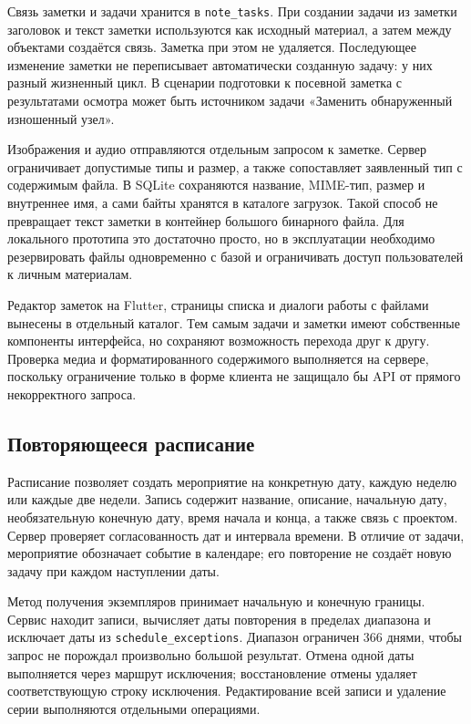 \documentclass[14pt,a4paper]{extarticle}
\begin{document}
Связь заметки и задачи хранится в \texttt{note\_tasks}. При создании задачи из заметки заголовок и текст заметки используются как исходный материал, а затем между объектами создаётся связь. Заметка при этом не удаляется. Последующее изменение заметки не переписывает автоматически созданную задачу: у них разный жизненный цикл. В сценарии подготовки к посевной заметка с результатами осмотра может быть источником задачи «Заменить обнаруженный изношенный узел».

Изображения и аудио отправляются отдельным запросом к заметке. Сервер ограничивает допустимые типы и размер, а также сопоставляет заявленный тип с содержимым файла. В SQLite сохраняются название, MIME-тип, размер и внутреннее имя, а сами байты хранятся в каталоге загрузок. Такой способ не превращает текст заметки в контейнер большого бинарного файла. Для локального прототипа это достаточно просто, но в эксплуатации необходимо резервировать файлы одновременно с базой и ограничивать доступ пользователей к личным материалам.

Редактор заметок на Flutter, страницы списка и диалоги работы с файлами вынесены в отдельный каталог. Тем самым задачи и заметки имеют собственные компоненты интерфейса, но сохраняют возможность перехода друг к другу. Проверка медиа и форматированного содержимого выполняется на сервере, поскольку ограничение только в форме клиента не защищало бы API от прямого некорректного запроса.

\subsection{Повторяющееся расписание}

Расписание позволяет создать мероприятие на конкретную дату, каждую неделю или каждые две недели. Запись содержит название, описание, начальную дату, необязательную конечную дату, время начала и конца, а также связь с проектом. Сервер проверяет согласованность дат и интервала времени. В отличие от задачи, мероприятие обозначает событие в календаре; его повторение не создаёт новую задачу при каждом наступлении даты.

Метод получения экземпляров принимает начальную и конечную границы. Сервис находит записи, вычисляет даты повторения в пределах диапазона и исключает даты из \texttt{schedule\_exceptions}. Диапазон ограничен 366 днями, чтобы запрос не порождал произвольно большой результат. Отмена одной даты выполняется через маршрут исключения; восстановление отмены удаляет соответствующую строку исключения. Редактирование всей записи и удаление серии выполняются отдельными операциями.
\end{document}
